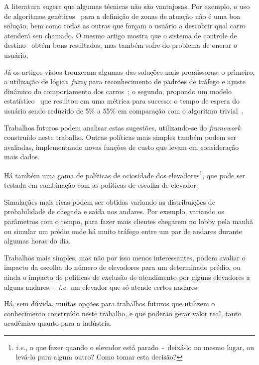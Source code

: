 A literatura sugere que algumas técnicas não são vantajosas. Por exemplo, o uso
de algoritmos genéticos~\cite{KOEHLEROTTIGER02} para a definição de zonas de
atuação não é uma boa solução, bem como todas as outras que forçam o usuário a
descobrir qual carro atenderá seu chamado. O mesmo artigo mostra que o sistema
de controle de destino~\cite{KOEHLEROTTIGER02} obtém bons resultados, mas também
sofre do problema de onerar o usuário.

Já os artigos vistos trouxeram algumas das soluções mais promissoras: o
primeiro, a utilização de lógica~\textit{fuzzy} para reconhecimento de padrões
de tráfego e ajuste dinâmico do comportamento dos carros~\cite{marja97}; o
segundo, propondo um modelo estatístico~\cite{DBLP:journals/corr/abs-1212-2499}
que resultou em uma métrica para sucesso: o tempo de espera do usuário sendo
reduzido de 5\% a 55\% em comparação com o algoritmo
trivial~\cite{DBLP:journals/corr/abs-1212-2499}.

Trabalhos futuros podem analisar estas sugestões, utilizando-se do
\textit{framework} construído neste trabalho. Outras políticas mais simples
também podem ser avaliadas, implementando novas funções de custo que levam em
consideração mais dados.

Há também uma gama de políticas de ociosidade dos
elevadores\footnote{\textit{i.e.}, o que fazer quando o elevador está
  parado~-~deixá-lo no mesmo lugar, ou levá-lo para algum outro? Como tomar esta
decisão?}, que pode ser testada em combinação com as políticas de escolha de elevador.

Simulações mais ricas podem ser obtidas variando as distribuições de
probabilidade de chegada e saída nos andares. Por exemplo, variando os
parâmetros com o tempo, para fazer mais clientes chegarem no lobby pela manhã ou
simular um prédio onde há muito tráfego entre um par de andares durante algumas
horas do dia.

Trabalhos mais simples, mas não por isso menos interessantes, podem avaliar o
impacto da escolha do número de elevadores para um determinado prédio, ou ainda
o impacto de políticas de exclusão de atendimento por alguns elevadores a alguns
andares~-~\textit{i.e.} um elevador que só atende certos andares.

Há, sem dúvida, muitas opções para trabalhos futuros que utilizem o conhecimento
construído neste trabalho, e que poderão gerar valor real, tanto acadêmico
quanto para a indústria.
